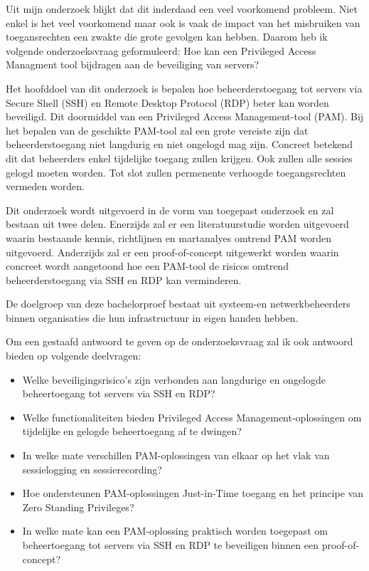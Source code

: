 Uit mijn onderzoek blijkt dat dit inderdaad een veel voorkomend probleem. Niet enkel is het veel voorkomend maar ook is vaak de impact van het misbruiken van toegansrechten een zwakte die grote gevolgen kan hebben. Daarom heb ik volgende onderzoeksvraag geformuleerd: Hoe kan een Privileged Access Managment tool bijdragen aan de beveiliging van servers?

Het hoofddoel van dit onderzoek is bepalen hoe beheerderstoegang tot servers via Secure Shell (SSH) en Remote Desktop Protocol (RDP) beter kan worden beveiligd. Dit doormiddel van een Privileged Access Management-tool (PAM). Bij het bepalen van de geschikte PAM-tool zal een grote vereiste zijn dat beheerderstoegang niet langdurig en niet ongelogd mag zijn. Concreet betekend dit dat beheerders enkel tijdelijke toegang zullen krijgen. Ook zullen alle sessies gelogd moeten worden. Tot slot zullen permenente verhoogde toegangsrechten vermeden worden.

Dit onderzoek wordt uitgevoerd in de vorm van toegepast onderzoek en zal bestaan uit twee delen. Enerzijds zal er een literatuurstudie worden uitgevoerd waarin bestaande kennis, richtlijnen en martanalyes omtrend PAM worden uitgevoerd. Anderzijds zal er een proof-of-concept uitgewerkt worden waarin concreet wordt aangetoond hoe een PAM-tool de risicos omtrend beheerderstoegang via SSH en RDP kan verminderen.

De doelgroep van deze bachelorproef bestaat uit systeem-en netwerkbeheerders binnen organisaties die hun infrastructuur in eigen handen hebben.

Om een gestaafd antwoord te geven op de onderzoeksvraag zal ik ook antwoord bieden op volgende deelvragen:
\begin{itemize}
	\item Welke beveiligingsrisico’s zijn verbonden aan langdurige en ongelogde beheertoegang tot servers via SSH en RDP?
	\item Welke functionaliteiten bieden Privileged Access Management-oplossingen om tijdelijke en gelogde beheertoegang af te dwingen?
	\item In welke mate verschillen PAM-oplossingen van elkaar op het vlak van sessielogging en sessierecording?
	\item Hoe ondersteunen PAM-oplossingen Just-in-Time toegang en het principe van Zero Standing Privileges?
	\item In welke mate kan een PAM-oplossing praktisch worden toegepast om beheertoegang tot servers via SSH en RDP te beveiligen binnen een proof-of-concept?
\end{itemize}


